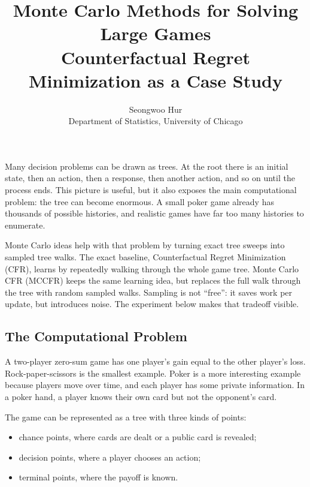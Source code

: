 \documentclass[11pt,reqno,twoside]{article}
\title{\Huge{Monte Carlo Methods for Solving Large Games}\\
\huge{Counterfactual Regret Minimization as a Case Study}}
\author{\Large{Seongwoo Hur}\\
Department of Statistics, University of Chicago}
\date{}
\theoremstyle{myThm}
\theoremstyle{myRem}
\theoremstyle{myDef}
\numberwithin{equation}{section}
\begin{document}
\maketitle

\newpage

\section{\Large{}}

\noindent
Many decision problems can be drawn as trees. At the root there is an
initial state, then an action, then a response, then another action, and so
on until the process ends. This picture is useful, but it also exposes the
main computational problem: the tree can become enormous. A small poker
game already has thousands of possible histories, and realistic games have
far too many histories to enumerate.

Monte Carlo ideas help with that problem by turning exact tree sweeps into
sampled tree walks. The exact baseline, Counterfactual Regret
Minimization (CFR), learns by repeatedly walking through the whole game
tree. Monte Carlo CFR (MCCFR) keeps the same learning idea, but replaces
the full walk through the tree with random sampled walks. Sampling is not
``free'': it saves work per update, but introduces noise. The experiment
below makes that tradeoff visible.

\subsection{The Computational Problem}

A two-player zero-sum game has one player's gain equal to the other
player's loss. Rock-paper-scissors is the smallest example. Poker is a
more interesting example because players move over time, and each player
has some private information. In a poker hand, a player knows their own
card but not the opponent's card.

The game can be represented as a tree with three kinds of points:
\begin{itemize}
\item chance points, where cards are dealt or a public card is revealed;
\item decision points, where a player chooses an action;
\item terminal points, where the payoff is known.
\end{itemize}
\end{document}
